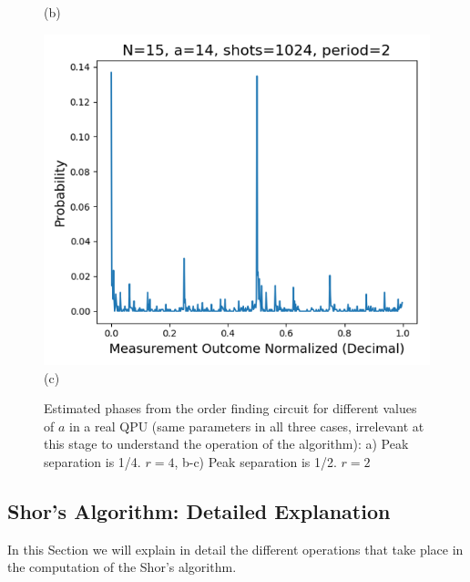 \documentclass[conference,twoside]{IEEEtran}
\begin{document}
\begin{figure}[!htbp]
\begin{minipage}{0.3\textwidth}
        \label{fig:second}
        \small (b)
    \end{minipage}\hspace{0.03\textwidth}
    \begin{minipage}{0.3\textwidth}
        \centering
        \includegraphics[width=\linewidth]{prob_dist_N15_a14_backend_aersim.png}
        \label{fig:third}
        \small (c)
    \end{minipage}
    \caption{Estimated phases from the order finding circuit for different values of $a$ in a real QPU (same parameters in all three cases, irrelevant at this stage to understand the operation of the algorithm): a) Peak separation is 1/4. $r = 4$, b-c) Peak separation is 1/2. $r = 2$}
    \label{fig:three_figures}
\end{figure}

\subsection{Shor's Algorithm: Detailed Explanation}
In this Section we will explain in detail the different operations that take place in the computation of the Shor's algorithm.
\end{document}
